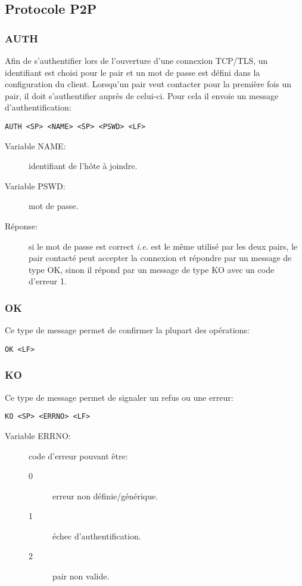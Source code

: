 \subsection{Protocole P2P}
\subsubsection*{AUTH}
Afin de s'authentifier lors de l'ouverture d'une connexion TCP/TLS,
un identifiant est choisi pour le pair et un mot de passe est défini dans la
configuration du client.
Lorsqu'un pair veut contacter pour la première fois un pair, il doit
s'authentifier auprès de celui-ci. Pour cela il envoie un message
d'authentification:
\begin{verbatim}
AUTH <SP> <NAME> <SP> <PSWD> <LF>
\end{verbatim}
\begin{description}
\item[Variable NAME:] identifiant de l'hôte à joindre.
\item[Variable PSWD:] mot de passe.
\item[Réponse:] si le mot de passe est correct \emph{i.e.} est le même
  utilisé par les deux pairs, le pair contacté peut accepter la connexion
  et répondre par un message de type OK, sinon il répond par un message de type
  KO avec un code d'erreur 1.
\end{description}

\subsubsection*{OK}
Ce type de message permet de confirmer la plupart des opérations:
\begin{verbatim}
OK <LF>
\end{verbatim}

\subsubsection*{KO}
Ce type de message permet de signaler un refus ou une erreur:
\begin{verbatim}
KO <SP> <ERRNO> <LF>
\end{verbatim}
\begin{description}
\item[Variable ERRNO: ] code d'erreur pouvant être:
  \begin{description}
  \item[0] erreur non définie/générique.
  \item[1] échec d'authentification.
  \item[2] pair non valide.
  \end{description}
\end{description}

